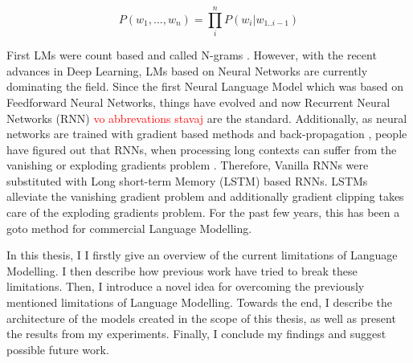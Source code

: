 \begin{displaymath}
    P(w_1, ..., w_n) = \prod_i^n P(w_i | w_{1..i-1})
\end{displaymath}

First LMs were count based and called N-grams \citep{martin2009speech}. However, with the recent advances in Deep Learning, LMs based on Neural Networks are currently dominating the field. Since the first Neural Language Model \citep{bengio2003neural} which was based on Feedforward Neural Networks, things have evolved and now Recurrent Neural Networks (RNN) \citep{mikolov2010recurrent} \textcolor{red}{vo abbrevations stavaj} are the standard. Additionally, as neural networks are trained with gradient based methods and back-propagation \citep{rumelhart1988learning}, people have figured out that RNNs, when processing long contexts can suffer from the vanishing or exploding gradients problem \citep{hochreiter1998vanishing, pascanu2012understanding, pascanu2013difficulty}. Therefore, Vanilla RNNs were substituted with Long short-term Memory (LSTM) \citep{hochreiter1997long} based RNNs. LSTMs alleviate the vanishing gradient problem and additionally gradient clipping \citep{pascanu2013difficulty} takes care of the exploding gradients problem. For the past few years, this has been a goto method for commercial Language Modelling.

In this thesis, I I firstly give an overview of the current limitations of Language Modelling. I then describe how previous work have tried to break these limitations. Then, I introduce a novel idea for overcoming the previously mentioned limitations of Language Modelling. Towards the end, I describe the architecture of the models created in the scope of this thesis, as well as present the results from my experiments. Finally, I conclude my findings and suggest possible future work.
